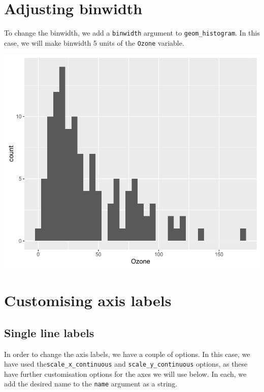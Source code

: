 \section{Adjusting binwidth}\label{adjusting-binwidth}

To change the binwidth, we add a \texttt{binwidth} argument to
\texttt{geom\_histogram}. In this case, we will make binwidth 5 units of
the \texttt{Ozone} variable.

\begin{Shaded}
\begin{Highlighting}[]
\StringTok{ }\NormalTok{(} \StringTok{ }
\StringTok{  }\NormalTok{(}\NormalTok{(}  \NormalTok{)}
\end{Highlighting}
\end{Shaded}

\begin{center}\includegraphics[width=0.6\linewidth]{7_Histograms_pdf/histogram_4-1} \end{center}

\section{Customising axis labels}\label{customising-axis-labels}

\subsection{Single line labels}\label{single-line-labels}

In order to change the axis labels, we have a couple of options. In this
case, we have used the\newline\texttt{scale\_x\_continuous} and
\texttt{scale\_y\_continuous} options, as these have further
customisation options for the axes we will use below. In each, we add
the desired name to the \texttt{name} argument as a string.

